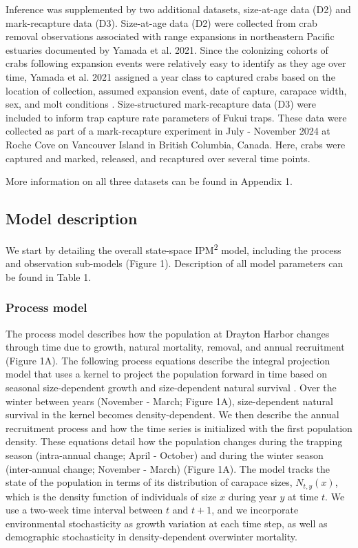 \documentclass{article}
\begin{document}
Inference was supplemented by two additional datasets, size-at-age data (D2) and mark-recapture data (D3). Size-at-age data (D2) were collected from crab removal observations associated with range expansions in northeastern Pacific estuaries documented by Yamada et al. 2021. Since the colonizing cohorts of crabs following expansion events were relatively easy to identify as they age over time, Yamada et al. 2021 assigned a year class to captured crabs based on the location of collection, assumed expansion event, date of capture, carapace width, sex, and molt conditions \parencite{yamada2021ocean}. Size-structured mark-recapture data (D3) were included to inform trap capture rate parameters of Fukui traps. These data were collected as part of a mark-recapture experiment in July - November 2024 at Roche Cove on Vancouver Island in British Columbia, Canada. Here, crabs were captured and marked, released, and recaptured over several time points.

More information on all three datasets can be found in Appendix 1. 

\subsection{Model description}

We start by detailing the overall state-space IPM\textsuperscript{2} model, including the process and observation sub-models (Figure 1). Description of all model parameters can be found in Table 1.

\subsubsection{Process model}

The process model describes how the population at Drayton Harbor changes through time due to growth, natural mortality, removal, and annual recruitment (Figure 1A). The following process equations describe the integral projection model that uses a kernel to project the population forward in time based on seasonal size-dependent growth and size-dependent natural survival \parencite{rees2014building}. Over the winter between years (November - March; Figure 1A), size-dependent natural survival in the kernel becomes density-dependent. We then describe the annual recruitment process and how the time series is initialized with the first population density. These equations detail how the population changes during the trapping season (intra-annual change; April - October) and during the winter season (inter-annual change; November - March) (Figure 1A). The model tracks the state of the population in terms of its distribution of carapace sizes, $N_{t, y}(x)$, which is the density function of individuals of size $x$ during year $y$ at time $t$. We use a two-week time interval between $t$ and $t + 1$, and we incorporate environmental stochasticity as growth variation at each time step, as well as demographic stochasticity in density-dependent overwinter mortality.
\end{document}
